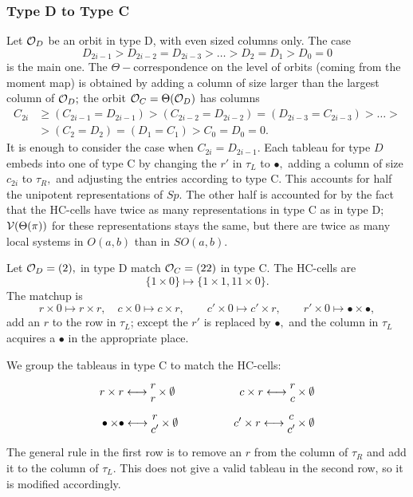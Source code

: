 \documentclass[11pt ,reqno]{amsart}
\begin{document}
\subsubsection{Type D to Type C} Let $\mathcal O_D$ be an orbit in type D, with even sized columns only. The case 
$$
D_{2i-1}>D_{2i-2}=D_{2i-3}>\dots >D_{2}=D_1>D_0=0
$$ 
is the main one.  The $\Theta-$correspondence on the level of orbits (coming from the moment map) is obtained by adding a column of size larger than the largest column of $\mathcal O_D;$ the orbit $\mathcal O_C=\Theta(\mathcal O_D)$  has columns 
$$
\begin{aligned}
 C_{2i}&\ge (C_{2i-1}=D_{2i-1})>(C_{2i-2}=D_{2i-2})=(D_{2i-3}=C_{2i-3})>\dots >\\
&>(C_2=D_2)=(D_1=C_1)>C_0=D_0=0. 
\end{aligned}
$$ 
It is enough to consider the case when   $C_{2i}=D_{2i-1}$. Each
tableau for type $D$ embeds into one of type C by changing the $r'$ in
$\tau_L$ to $\bullet,$ adding a column of size $c_{2i}$ to $\tau_R,$
and adjusting the entries according to type C. This accounts for half
the unipotent representations of $Sp.$ The other half is accounted for
by the fact that the HC-cells have twice as many representations in
type C as in type D; ${\mathcal V}(\Theta(\pi))$ for these representations
stays the same, but there are twice as many local systems in $O(a,b)$
than in $SO(a,b).$
\begin{example}
Let $\mathcal O_D=(2),$ in type D match $\mathcal O_C=(22)$ in type C.  The HC-cells
are
$$
\{1\times 0\}\mapsto \{1\times 1, 11\times 0\}.
$$
The matchup is
$$
r\times 0\mapsto r\times r,\quad c\times 0\mapsto c\times r,\qquad
c'\times 0\mapsto c'\times r,\qquad r'\times 0\mapsto \bullet\times \bullet,
$$
add an $r$ to the row in $\tau_L$; except the $r'$ is replaced by
$\bullet,$ and the column in $\tau_L$ acquires a $\bullet$ in the
appropriate place.

We group the tableaus in type C to match the HC-cells:
$$
\begin{aligned}
&r\times r\longleftrightarrow \begin{matrix} r\\r\end{matrix}\times \begin{matrix}\emptyset\\ \end{matrix}
\qquad&\qquad
c\times
  r\longleftrightarrow\begin{matrix} r\\c\end{matrix}\times\begin{matrix}\emptyset\\\end{matrix} &\\
 &\bullet\times \bullet\longleftrightarrow
  \begin{matrix} r\\ c'\end{matrix}\times\begin{matrix}\emptyset\\\end{matrix}\qquad &\qquad c'\times r\longleftrightarrow
  \begin{matrix} c\\ c'\end{matrix}\times\begin{matrix}\emptyset\\\end{matrix}&
\end{aligned}
$$
The general rule in the first row is to remove an $r$ from the column
of $\tau_R$ and add it to the column of $\tau_L.$ This does not give a
valid tableau in the second row, so it is modified accordingly. 
\end{example}
\end{document}
